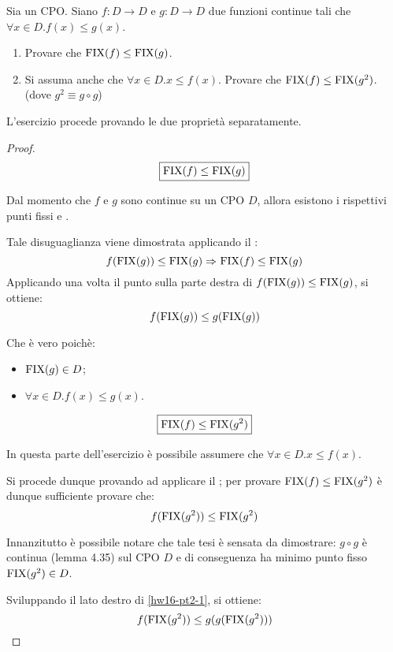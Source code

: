 {
  Sia  un CPO. Siano $f: D \to D$ e $g: D \to D$ due funzioni
  continue tali che $\forall{x}\in D. f(x) \leq{} g(x)$.
  \begin{enumerate}
    \item Provare che $\textrm{\normalfont{FIX}}(f) \leq{} \textrm{\normalfont{FIX}}(g)$.
    \item Si assuma anche che $\forall{x}\in D.x \leq{} f(x)$. Provare che
      $\textrm{\normalfont{FIX}}(f) \leq \textrm{\normalfont{FIX}}(g^2)$. (dove $g^2 \equiv{} g \circ g$)
  \end{enumerate}
}
{}
L'esercizio procede provando le due proprietà separatamente.

\begin{proof}
$$
\boxed{\textrm{\normalfont{FIX}}(f) \leq{} \textrm{\normalfont{FIX}}(g)}
$$

Dal momento che $f$ e $g$ sono continue su un CPO $D$, allora esistono i
rispettivi punti fissi  e .

Tale disuguaglianza viene dimostrata applicando il \FPIL:
\begin{equation}
f(\textrm{\normalfont{FIX}}(g)) \leq \textrm{\normalfont{FIX}}(g)  \Rightarrow^{} \textrm{\normalfont{FIX}}(f) \leq{} \textrm{\normalfont{FIX}}(g)
\label{hw16-x}
\end{equation}
Applicando una volta il punto sulla parte destra di $f(\textrm{\normalfont{FIX}}(g)) \leq \textrm{\normalfont{FIX}}(g)$,
si ottiene:
$$
f(\textrm{\normalfont{FIX}}(g)) \leq g(\textrm{\normalfont{FIX}}(g))
$$

Che è vero poichè:
\begin{itemize}
  \item $\textrm{\normalfont{FIX}}(g) \in D$;
  \item $\forall{x}\in D. f(x) \leq{} g(x)$.
\end{itemize}

$$
\boxed{\textrm{\normalfont{FIX}}(f) \leq \textrm{\normalfont{FIX}}(g^2)}
$$

In questa parte dell'esercizio è possibile assumere che
$\forall{x}\in D.x \leq{} f(x)$.

Si procede dunque provando ad applicare il \FPIL{}; per provare
$\textrm{\normalfont{FIX}}(f) \leq \textrm{\normalfont{FIX}}(g^2)$ è dunque sufficiente provare che:
\begin{equation}
  f(\textrm{\normalfont{FIX}}(g^2)) \leq{} \textrm{\normalfont{FIX}}(g^2)
  \label{hw16-pt2-1}
\end{equation}

Innanzitutto è possibile notare che tale tesi è sensata da dimostrare:
$g \circ g$ è continua (lemma 4.35) sul CPO $D$ e di conseguenza ha minimo
punto fisso $\textrm{\normalfont{FIX}}(g^2)\in D$.

Sviluppando il lato destro di \ref{hw16-pt2-1}, si ottiene:
\begin{equation}
  f(\textrm{\normalfont{FIX}}(g^2)) \leq{} g(g(\textrm{\normalfont{FIX}}(g^2)))
  \label{hw16-pt2-1}
\end{equation}


\end{proof}
